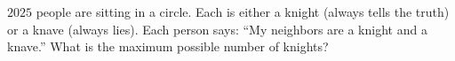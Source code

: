 $2025$ people are sitting in a circle. Each is either a knight (always tells the truth) or a knave (always lies). Each person says: ``My neighbors are a knight and a knave.'' What is the maximum possible number of knights?
